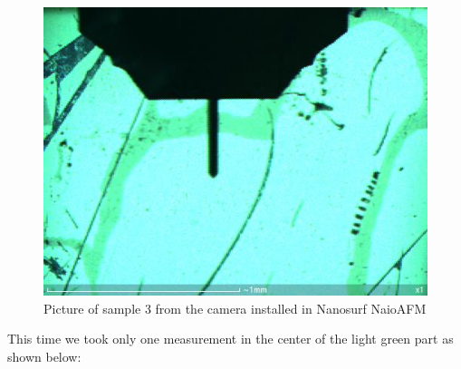 \documentclass[11pt,a4paper]{article}
\begin{document}
\begin{figure}[ht]
\centering
\includegraphics[scale=0.4]{sm_sample3_set}
\caption{Picture of sample 3 from the camera installed in Nanosurf NaioAFM}
\label{fig:sample3_set}
\end{figure}

This time we took only one measurement in the center of the light green part as shown below:
\end{document}
